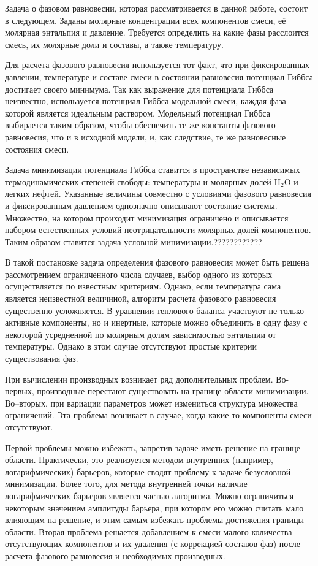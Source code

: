 ﻿\documentclass[12pt]{article}
\begin{document}
Задача о фазовом равновесии, которая рассматривается в данной работе, состоит в следующем. Заданы молярные концентрации
всех компонентов смеси, её молярная энтальпия и давление. Требуется определить на какие фазы расслоится смесь, их
молярные доли и составы, а также температуру.

Для расчета фазового равновесия используется тот факт, что при фиксированных давлении, температуре и составе смеси в
состоянии равновесия потенциал Гиббса достигает своего минимума. Так как выражение для потенциала Гиббса неизвестно,
используется потенциал Гиббса модельной смеси, каждая фаза которой является идеальным раствором. Модельный потенциал
Гиббса выбирается таким образом, чтобы обеспечить те же константы фазового равновесия, что и в исходной модели, и, как
следствие, те же равновесные состояния смеси.

Задача минимизации потенциала Гиббса ставится в пространстве независимых термодинамических степеней свободы:
температуры и молярных долей $\mathrm{H_2O}$ и легких нефтей. Указанные величины совместно с условиями фазового
равновесия и фиксированным давлением однозначно описывают состояние системы. Множество, на котором проиходит
минимизация ограничено и описывается набором естественных условий неотрицательности молярных долей компонентов. Таким
образом ставится задача условной минимизации.????????????

В такой постановке задача определения фазового равновесия может быть решена рассмотрением ограниченного числа случаев,
выбор одного из которых осуществляется по известным критериям. Однако, если температура сама является неизвестной
величиной, алгоритм расчета фазового равновесия существенно усложняется. В уравнении теплового баланса участвуют не
только активные компоненты, но и инертные, которые можно объединить в одну фазу с некоторой усредненной по молярным
долям зависимостью энтальпии от температуры. Однако в этом случае отсутствуют простые критерии существования фаз.

При вычислении производных возникает ряд дополнительных проблем. Во-первых, производные перестают существовать на
границе области минимизации. Во--вторых, при вариации параметров может измениться структура множества ограничений. Эта
проблема возникает в случае, когда какие-то компоненты смеси отсутствуют.

Первой проблемы можно избежать, запретив задаче иметь решение на границе области. Практически, это реализуется методом
внутренних (например, логарифмических) барьеров, которые сводят проблему к задаче безусловной минимизации. Более того,
для метода внутренней точки наличие логарифмических барьеров является частью алгоритма. Можно ограничиться некоторым
значением амплитуды барьера, при котором его можно считать мало влияющим на решение, и этим самым избежать проблемы
достижения границы области. Вторая проблема решается добавлением к смеси малого количества отсутствующих компонентов и
их удаления (с коррекцией составов фаз) после расчета фазового равновесия и необходимых производных.
\end{document}

